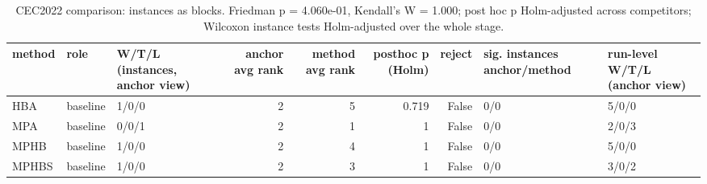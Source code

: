 \begin{table}[t]
\centering
\scriptsize
\caption{CEC2022 comparison: instances as blocks. Friedman p = 4.060e-01, Kendall's W = 1.000; post hoc p Holm-adjusted across competitors; Wilcoxon instance tests Holm-adjusted over the whole stage.}
\label{tab:cec2022_comparison_global}
\begin{tabular}{lllrrrrll}
\toprule
method & role & W/T/L (instances, anchor view) & anchor avg rank & method avg rank & posthoc p (Holm) & reject & sig. instances anchor/method & run-level W/T/L (anchor view) \\
\midrule
HBA & baseline & 1/0/0 & 2 & 5 & 0.719 & False & 0/0 & 5/0/0 \\
MPA & baseline & 0/0/1 & 2 & 1 & 1 & False & 0/0 & 2/0/3 \\
MPHB & baseline & 1/0/0 & 2 & 4 & 1 & False & 0/0 & 5/0/0 \\
MPHBS & baseline & 1/0/0 & 2 & 3 & 1 & False & 0/0 & 3/0/2 \\
\bottomrule
\end{tabular}
\end{table}
